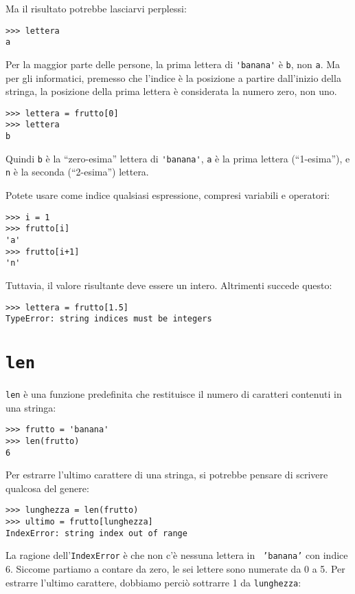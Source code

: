 \documentclass[10pt]{book}
\begin{document}
Ma il risultato potrebbe lasciarvi perplessi:

\begin{verbatim}
>>> lettera
a
\end{verbatim}
%
Per la maggior parte delle persone, la prima lettera di \verb"'banana'" è {\tt b}, non
{\tt a}.  Ma per gli informatici, premesso che l'indice è la posizione a partire dall'inizio della stringa, la posizione della prima lettera è considerata la numero zero, non uno.

\begin{verbatim}
>>> lettera = frutto[0]
>>> lettera
b
\end{verbatim}
%
Quindi {\tt b} è la ``zero-esima'' lettera di \verb"'banana'", {\tt a}
è la prima lettera (``1-esima''), e {\tt n} è la seconda (``2-esima'')
lettera.

Potete usare come indice qualsiasi espressione, compresi variabili e operatori:

\begin{verbatim}
>>> i = 1
>>> frutto[i]
'a'
>>> frutto[i+1]
'n'
\end{verbatim}
%

Tuttavia, il valore risultante deve essere un intero. Altrimenti succede questo:

\begin{verbatim}
>>> lettera = frutto[1.5]
TypeError: string indices must be integers
\end{verbatim}
%

\section{{\tt len}}

{\tt len} è una funzione predefinita che restituisce il numero di caratteri contenuti in una stringa:

\begin{verbatim}
>>> frutto = 'banana'
>>> len(frutto)
6
\end{verbatim}
%
Per estrarre l'ultimo carattere di una stringa, si potrebbe pensare di scrivere qualcosa del genere:

\begin{verbatim}
>>> lunghezza = len(frutto)
>>> ultimo = frutto[lunghezza]
IndexError: string index out of range
\end{verbatim}
%
La ragione dell'{\tt IndexError} è che non c'è nessuna lettera in {\tt
'banana'} con indice 6. Siccome partiamo a contare da zero, le sei lettere sono numerate da 0 a 5. Per estrarre l'ultimo carattere, dobbiamo perciò sottrarre 1 da {\tt lunghezza}:
\end{document}
